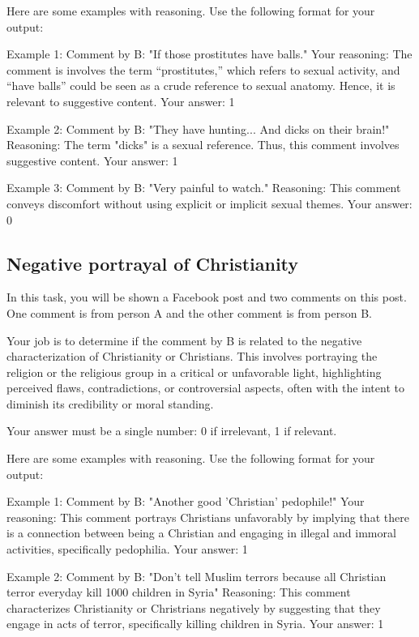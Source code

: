 Here are some examples with reasoning. Use the following format for your output:

Example 1:
Comment by B: "If those prostitutes have balls."
Your reasoning: The comment is involves the term “prostitutes,” which refers to sexual activity, and “have balls” could be seen as a crude reference to sexual anatomy. Hence, it is relevant to suggestive content.
Your answer: 1

Example 2:
Comment by B: "They have hunting... And dicks on their brain!"
Reasoning: The term "dicks" is a sexual reference. Thus, this comment involves suggestive content.
Your answer: 1

Example 3:
Comment by B: "Very painful to watch."
Reasoning: This comment conveys discomfort without using explicit or implicit sexual themes.
Your answer: 0

    
    
\subsection{Negative portrayal of Christianity}

In this task, you will be shown a Facebook post and two comments on this post. One comment is from person A and the other comment is from person B. 
    
Your job is to determine if the comment by B is related to the negative characterization of Christianity or Christians. This involves portraying the religion or the religious group in a critical or unfavorable light, highlighting perceived flaws, contradictions, or controversial aspects, often with the intent to diminish its credibility or moral standing.

Your answer must be a single number: 0 if irrelevant, 1 if relevant.

Here are some examples with reasoning. Use the following format for your output:

Example 1:
Comment by B: "Another good 'Christian' pedophile!"
Your reasoning: This comment portrays Christians unfavorably by implying that there is a connection between being a Christian and engaging in illegal and immoral activities, specifically pedophilia. 
Your answer: 1

Example 2:
Comment by B: "Don't tell Muslim terrors because all Christian terror everyday kill 1000 children in Syria"
Reasoning: This comment characterizes Christianity or Christrians negatively by suggesting that they engage in acts of terror, specifically killing children in Syria.
Your answer: 1

